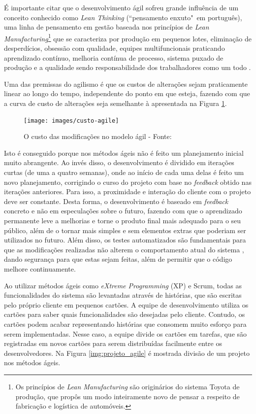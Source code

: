 É importante citar que o desenvolvimento ágil sofreu grande influência de um conceito conhecido como \textit{Lean Thinking} (``pensamento enxuto"\ em português), uma linha de pensamento em gestão baseada nos princípios de \textit{Lean Manufacturing}\footnote{Os princípios de \textit{Lean Manufacturing} são originários do sistema Toyota de produção, que propôs um modo inteiramente novo de pensar a respeito de fabricação e logística de automóveis.} que se caracteriza por produção em pequenos lotes, eliminação de desperdícios, obsessão com qualidade, equipes multifuncionais praticando aprendizado contínuo, melhoria contínua de processo, sistema puxado de produção e a qualidade sendo responsabilidade dos trabalhadores como um todo \cite{BDDRodrigo}.

Uma das premissas do agilismo é que os custos de alterações sejam praticamente linear ao longo do tempo, independente do ponto em que esteja, fazendo com que a curva de custo de alterações seja semelhante à apresentada na Figura \ref{img:custo-agile}.

\begin{figure}[h]
  \center
  \caption{O custo das modificações no modelo ágil - Fonte: \cite{XPKent}}
  \texttt{[image: images/custo-agile]}
  \label{img:custo-agile}
\end{figure}

Isto é conseguido porque nos métodos ágeis não é feito um planejamento inicial muito abrangente. Ao invés disso, o desenvolvimento é dividido em iterações curtas (de uma a quatro semanas), onde ao início de cada uma delas é feito um novo planejamento, corrigindo o curso do projeto com base no \textit{feedback} obtido nas iterações anteriores. Para isso, a proximidade e interação do cliente com o projeto deve ser constante. Desta forma, o desenvolvimento é baseado em \textit{feedback} concreto e não em especulações sobre o futuro, fazendo com que o aprendizado permanente leve a melhorias e torne o produto final mais adequado para o seu público, além de o tornar mais simples e sem elementos extras que poderiam ser utilizados no futuro. Além disso, os testes automatizados são fundamentais para que as modificações realizadas não alterem o comportamento atual do sistema  \cite{XPKent}, dando segurança para que estas sejam feitas, além de permitir que o código melhore continuamente.

Ao utilizar métodos ágeis como \textit{eXtreme Programming} (XP)  e Scrum, todas as funcionalidades do sistema são levantadas através de histórias, que são escritas pelo próprio cliente em pequenos cartões. A equipe de desenvolvimento utiliza os cartões para saber quais funcionalidades são desejadas pelo cliente. Contudo, os cartões podem acabar representando histórias que consomem muito esforço para serem implementadas. Nesse caso, a equipe divide os cartões em tarefas, que são registradas em novos cartões para serem distribuídas facilmente entre os desenvolvedores. Na Figura \ref{img:projeto_agile} é mostrada divisão de um projeto nos métodos ágeis.

